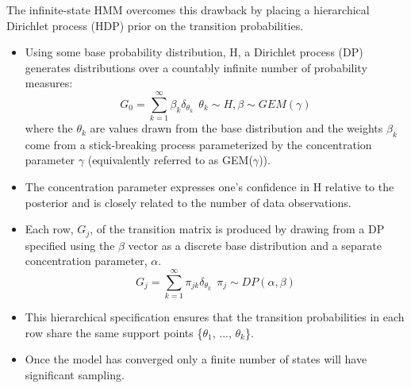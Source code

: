 \documentclass{article}
\begin{document}
  The infinite-state HMM overcomes this drawback by placing a hierarchical
  Dirichlet process (HDP) prior on the transition probabilities.
  \begin{itemize}
    \item Using some base probability distribution, H, a Dirichlet process 
    (DP) generates distributions over a countably infinite number of 
    probability measures:
    \begin{equation}
      G_0 = \sum_{k=1}^{\infty} \beta_k \delta_{\theta_k} ~~ \theta_k \sim H, \beta \sim GEM(\gamma)
    \end{equation}
    where the $\theta_k$ are values drawn from the base distribution and the
    weights $\beta_k$ come from a stick-breaking process parameterized by the concentration 
    parameter $\gamma$ (equivalently referred to as GEM($\gamma$)). 
    \item The concentration parameter expresses one's confidence in H relative to the posterior 
    and is closely related to the number of data observations.
    \item Each row, $G_j$, of the transition matrix is produced by drawing from a DP specified 
    using the $\beta$ vector as a discrete base distribution and a separate concentration
    parameter, $\alpha$.
    \begin{equation}
      G_j = \sum_{k=1}^{\infty} \pi_{jk} \delta_{\theta_k} ~~ \pi_j \sim DP(\alpha, \beta)
    \end{equation}
    \item This hierarchical specification ensures that the transition probabilities in 
    each row share the same support points \{$\theta_1$, ..., $\theta_k$\}.
    \item Once the model has converged only a finite number of states will have significant
    sampling.
  \end{itemize}
  
\end{document}
